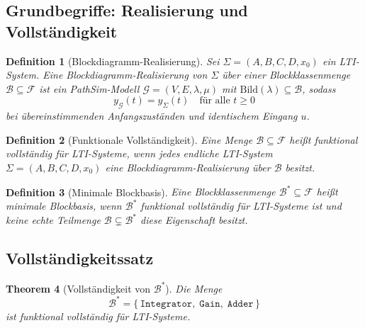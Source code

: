 ﻿\documentclass[12pt,a4paper]{article}
\newtheorem{theorem}{Theorem}[section]
\newtheorem{definition}[theorem]{Definition}
\theoremstyle{definition}
\begin{document}
\subsection{Grundbegriffe: Realisierung und Vollständigkeit}

\begin{definition}[Blockdiagramm-Realisierung]
\label{def:realisierung}
Sei $\Sigma = (A, B, C, D, x_0)$ ein LTI-System. Eine
\emph{Blockdiagramm-Realisierung} von $\Sigma$ über einer Blockklassenmenge
$\mathcal{B} \subseteq \mathcal{F}$ ist ein PathSim-Modell
$\mathcal{G} = (V, E, \lambda, \mu)$ mit $\mathrm{Bild}(\lambda) \subseteq \mathcal{B}$,
sodass
\[
  y_{\mathcal{G}}(t) = y_{\Sigma}(t) \quad \text{für alle } t \geq 0
\]
bei übereinstimmenden Anfangszuständen und identischem Eingang $u$.
\end{definition}

\begin{definition}[Funktionale Vollständigkeit]
\label{def:vollstaendig}
Eine Menge $\mathcal{B} \subseteq \mathcal{F}$ heißt \emph{funktional
vollständig für LTI-Systeme}, wenn jedes endliche LTI-System
$\Sigma = (A, B, C, D, x_0)$ eine Blockdiagramm-Realisierung über
$\mathcal{B}$ besitzt.
\end{definition}

\begin{definition}[Minimale Blockbasis]
\label{def:basis}
Eine Blockklassenmenge $\mathcal{B}^* \subseteq \mathcal{F}$ heißt
\emph{minimale Blockbasis}, wenn $\mathcal{B}^*$ funktional vollständig
für LTI-Systeme ist und keine echte Teilmenge
$\mathcal{B} \subsetneq \mathcal{B}^*$ diese Eigenschaft besitzt.
\end{definition}

\subsection{Vollständigkeitssatz}

\begin{theorem}[Vollständigkeit von $\mathcal{B}^*$]
\label{thm:vollstaendig}
Die Menge
\[
  \mathcal{B}^* = \bigl\{\,\texttt{Integrator},\;\texttt{Gain},\;\texttt{Adder}\,\bigr\}
\]
ist funktional vollständig für LTI-Systeme.
\end{theorem}
\end{document}
